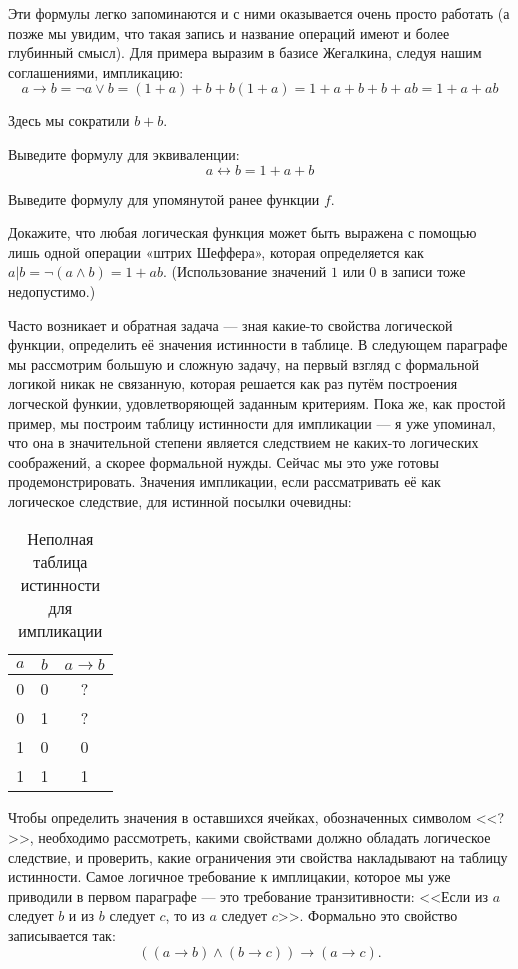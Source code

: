 Эти формулы легко запоминаются и с ними оказывается очень просто работать (а позже мы увидим, что такая запись и название операций имеют и более глубинный смысл). Для примера выразим в базисе Жегалкина, следуя нашим соглашениями, импликацию: $$a \rightarrow b = \neg a \lor b = (1 + a) + b + b(1 + a) = 1 + a + b + b + ab = 1 + a + ab$$

Здесь мы сократили $b+b$.

\begin{exercise} Выведите формулу для эквиваленции: $$a \leftrightarrow b = 1 + a + b$$\end{exercise}

\begin{exercise} Выведите формулу для упомянутой ранее функции $f$.\end{exercise}

\begin{exercise} Докажите, что любая логическая функция может быть выражена с помощью лишь одной операции «штрих Шеффера», которая определяется как $a|b = \neg(a\land b) = 1 + ab$. (Использование значений $1$ или $0$ в записи тоже недопустимо.)\end{exercise}

Часто возникает и обратная задача --- зная какие-то свойства логической функции, определить её значения истинности в таблице. В следующем параграфе мы рассмотрим большую и сложную задачу, на первый взгляд с формальной логикой никак не связанную, которая решается как раз путём построения логческой функии, удовлетворяющей заданным критериям. Пока же, как простой пример, мы построим таблицу истинности для импликации --- я уже упоминал, что она в значительной степени является следствием не каких-то логических соображений, а скорее формальной нужды. Сейчас мы это уже готовы продемонстрировать. Значения импликации, если рассматривать её как логическое следствие, для истинной посылки очевидны:

\begin{table}[h]
\centering
\begin{tabular}{cc|c}
$a$ & $b$ & $a \to b$ \\
\hline
0 & 0 & ? \\
0 & 1 & ? \\
1 & 0 & 0 \\
1 & 1 & 1
\end{tabular}
\caption{Неполная таблица истинности для импликации}
\end{table}

Чтобы определить значения в оставшихся ячейках, обозначенных символом <<?>>, необходимо рассмотреть, какими свойствами должно обладать логическое следствие, и проверить, какие ограничения эти свойства накладывают на таблицу истинности. Самое логичное требование к имплицакии, которое мы уже приво\-ди\-ли в первом параграфе --- это требование транзитивности: \mbox{<<Если} из $a$ следует $b$ и из $b$ следует $c$, то из $a$ следует $c$>>. Формально это свойство записывается так: $$((a\to b) \land (b \to c)) \to (a\to c).$$

